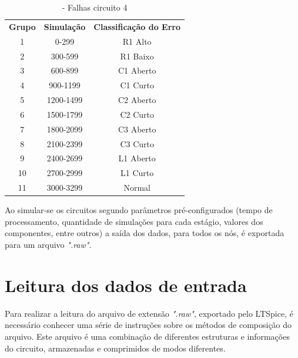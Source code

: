 \begin{enumerate}
 \begin{table}[H]
         \centering
        \begin{tabular}{ccc}
        \textbf{Grupo} & \textbf{Simulação} & \textbf{Classificação do Erro} \\
        1              & 0-299              & R1 Alto                        \\
        2              & 300-599            & R1 Baixo                       \\
        3              & 600-899            & C1 Aberto                        \\
        4              & 900-1199           & C1 Curto                       \\
        5              & 1200-1499          & C2 Aberto                        \\
        6              & 1500-1799          & C2 Curto                       \\
        7              & 1800-2099          & C3 Aberto                      \\
        8              & 2100-2399          & C3 Curto                       \\
        9              & 2400-2699          & L1 Aberto                      \\
        10             & 2700-2999          & L1 Curto                       \\
        11             & 3000-3299          & Normal                        
        \end{tabular}
        \caption{\label{tab:falhasckt4}- Falhas circuito 4}
\end{table}



\end{enumerate}

Ao simular-se os circuitos segundo parâmetros pré-configurados (tempo de processamento, quantidade de simulações para cada estágio, valores dos componentes, entre outros) a saída dos dados, para todos os nós, é exportada para um arquivo \textit{".raw"}.

\section{\textbf{Leitura dos dados de entrada}}

Para realizar a leitura do arquivo de extensão \textit{".raw"}, exportado pelo LTSpice, é necessário conhecer uma série de instruções sobre os métodos de composição do arquivo. Este arquivo é uma combinação de diferentes estruturas e informações do circuito, armazenadas e comprimidos de modos diferentes.

